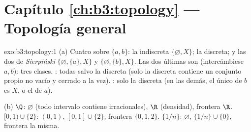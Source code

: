 \section*{Capítulo \ref{ch:b3:topology} --- Topología general}

\begin{solution}{exo:b3:topology:1}
(a) Cuatro  sobre $\{a,b\}$: la indiscreta
$\{\varnothing, X\}$; la discreta; y las dos  de
\emph{Sierpiński} $\{\varnothing, \{a\}, X\}$ y $\{\varnothing,
\{b\}, X\}$. Las dos últimas son
 (intercámbiese $a, b$):
tres clases. : todas salvo la
discreta (solo la  discreta
contiene un conjunto propio no vacío  y cerrado a la vez).
: solo la discreta (en
las demás, el único  de $b$ es
$X$, o el de $a$).

(b) $\Q$:  $\varnothing$
(todo intervalo contiene irracionales),
 $\R$ (densidad), frontera
$\R$. $[0,1)
\cup \{2\}$:  $(0,1)$,
 $[0,1]\cup\{2\}$, frontera
$\{0, 1, 2\}$. $\{1/n\}$: 
$\varnothing$, 
$\{1/n\}\cup\{0\}$, frontera la
 misma.
\end{solution}

